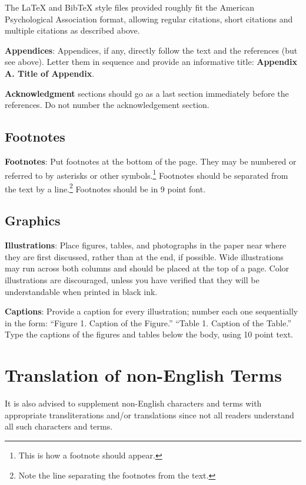\documentclass[11pt,letterpaper]{article}
\begin{document}
The \LaTeX{} and Bib\TeX{} style files provided roughly fit the
American Psychological Association format, allowing regular citations,
short citations and multiple citations as described above.

{\bf Appendices}: Appendices, if any, directly follow the text and the
references (but see above).  Letter them in sequence and provide an
informative title: {\bf Appendix A. Title of Appendix}.

\textbf{Acknowledgment} sections should go as a last section immediately
before the references. Do not number the acknowledgement section.

\subsection{Footnotes}

{\bf Footnotes}: Put footnotes at the bottom of the page. They may
be numbered or referred to by asterisks or other
symbols.\footnote{This is how a footnote should appear.} Footnotes
should be separated from the text by a line.\footnote{Note the
line separating the footnotes from the text.}  Footnotes should be in 9 point font.

\subsection{Graphics}

{\bf Illustrations}: Place figures, tables, and photographs in the
paper near where they are first discussed, rather than at the end, if
possible.  Wide illustrations may run across both columns and should be placed at
the top of a page. Color illustrations are discouraged, unless you have verified that
they will be understandable when printed in black ink.

{\bf Captions}: Provide a caption for every illustration; number each one
sequentially in the form:  ``Figure 1. Caption of the Figure.'' ``Table 1.
Caption of the Table.''  Type the captions of the figures and
tables below the body, using 10 point text.

\section{Translation of non-English Terms}

It is also advised to supplement non-English characters and terms
with appropriate transliterations and/or translations
since not all readers understand all such characters and terms.
\end{document}
